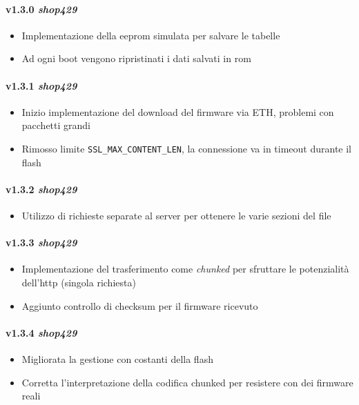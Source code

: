 \paragraph{v1.3.0 \textit{shop429}}
  \begin{itemize}
  	\item Implementazione della eeprom simulata per salvare le tabelle
    \item Ad ogni boot vengono ripristinati i dati salvati in rom
  \end{itemize}
\paragraph{v1.3.1 \textit{shop429}}
  \begin{itemize}
  	\item Inizio implementazione del download del firmware via ETH, problemi con pacchetti grandi
    \item Rimosso limite \texttt{SSL\_MAX\_CONTENT\_LEN}, la connessione va in timeout durante il flash
  \end{itemize}
\paragraph{v1.3.2 \textit{shop429}}
  \begin{itemize}
    \item Utilizzo di richieste separate al server per ottenere le varie sezioni del file
  \end{itemize}
\paragraph{v1.3.3 \textit{shop429}}
  \begin{itemize}
    \item Implementazione del trasferimento come \textit{chunked} per sfruttare le potenzialit\`a dell'http (singola richiesta)
  	\item Aggiunto controllo di checksum per il firmware ricevuto
  \end{itemize}
\paragraph{v1.3.4 \textit{shop429}}
  \begin{itemize}
  	\item Migliorata la gestione con costanti della flash
    \item Corretta l'interpretazione della codifica chunked per resistere con dei firmware reali
  \end{itemize}
